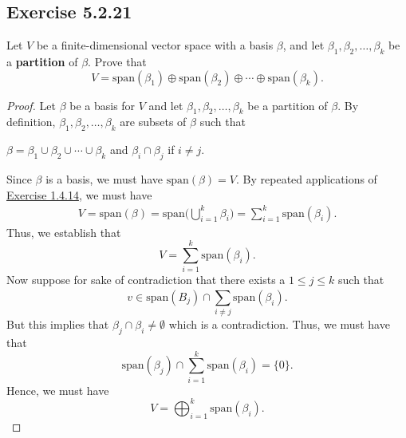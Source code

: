 \subsection*{Exercise 5.2.21} Let \( V  \) be a finite-dimensional vector space with a basis \( \beta  \), and let \( {\beta}_{1}, {\beta}_{2}, \dots, {\beta}_{k} \) be a \textbf{partition} of \( \beta  \). Prove that  
\[  V = \text{span}({\beta}_{1}) \oplus \text{span}({\beta}_{2}) \oplus \cdots \oplus \text{span}({\beta}_{k}).  \]
\begin{proof}
Let \( \beta \) be a basis for \( V  \) and let \( {\beta}_{1}, {\beta}_{2}, \dots, {\beta}_{k} \) be a partition of \( \beta \). By definition, \( {\beta}_{1}, {\beta}_{2}, \dots, {\beta}_{k } \) are subsets of \( \beta \) such that
\begin{center}
    \( \beta = {\beta}_{1} \cup {\beta}_{2} \cup \cdots \cup {\beta}_{k} \) and \( {\beta}_{i} \cap {\beta}_{j} \) if \( i \neq j \).
\end{center}
Since \( \beta \) is a basis, we must have \( \text{span}(\beta) = V  \). By repeated applications of {\hyperref[Exercise 1.4.14]{Exercise 1.4.14}}, we must have
\begin{align*}
    V = \text{span}(\beta) = \text{span}\Big(\bigcup_{ i=1 }^{ k  }  {\beta}_{i}\Big) = \sum_{ i=1  }^{ k  } \text{span}({\beta}_{i}).
\end{align*}
Thus, we establish that
\[  V = \sum_{ i=1  }^{ k  } \text{span}({\beta}_{i}). \]
Now suppose for sake of contradiction that there exists a \( 1 \leq j \leq k  \) such that
\[  v \in \text{span}({B}_{j}) \cap \sum_{  i \neq j  }^{  } \text{span}({\beta}_{i}). \]
But this implies that \( {\beta}_{j} \cap {\beta}_{i} \neq \emptyset \) which is a contradiction. Thus, we must have that
\[  \text{span}({\beta}_{j}) \cap \sum_{ i=1  }^{ k  } \text{span}({\beta}_{i})  = \{  0  \}.\]
Hence, we must have 
\[  V = \bigoplus_{i=1}^{k} \text{span}({\beta}_{i}). \]
\end{proof}

